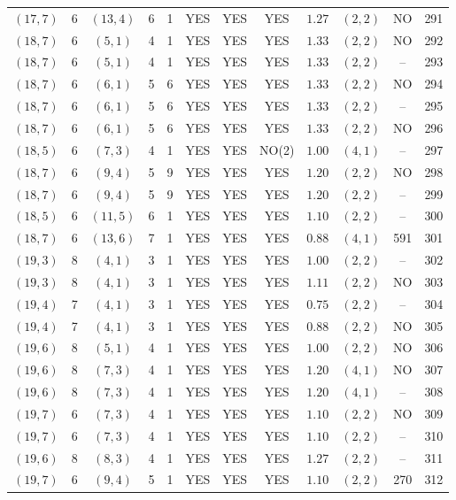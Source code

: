 \begin{longtable}{|c|c|c|c|c|c|c|c|c|c|c|c|}
$(17,7)$ & 6 & $(13,4)$ & 6 & 1 & YES & YES & YES & $1.27$ & $(2,2)$ & NO & 291\\
$(18,7)$ & 6 & $(5,1)$ & 4 & 1 & YES & YES & YES & $1.33$ & $(2,2)$ & NO & 292\\
$(18,7)$ & 6 & $(5,1)$ & 4 & 1 & YES & YES & YES & $1.33$ & $(2,2)$ & -- & 293\\
$(18,7)$ & 6 & $(6,1)$ & 5 & 6 & YES & YES & YES & $1.33$ & $(2,2)$ & NO & 294\\
$(18,7)$ & 6 & $(6,1)$ & 5 & 6 & YES & YES & YES & $1.33$ & $(2,2)$ & -- & 295\\
$(18,7)$ & 6 & $(6,1)$ & 5 & 6 & YES & YES & YES & $1.33$ & $(2,2)$ & NO & 296\\
$(18,5)$ & 6 & $(7,3)$ & 4 & 1 & YES & YES & NO(2) & $1.00$ & $(4,1)$ & -- & 297\\
$(18,7)$ & 6 & $(9,4)$ & 5 & 9 & YES & YES & YES & $1.20$ & $(2,2)$ & NO & 298\\
$(18,7)$ & 6 & $(9,4)$ & 5 & 9 & YES & YES & YES & $1.20$ & $(2,2)$ & -- & 299\\
$(18,5)$ & 6 & $(11,5)$ & 6 & 1 & YES & YES & YES & $1.10$ & $(2,2)$ & -- & 300\\
$(18,7)$ & 6 & $(13,6)$ & 7 & 1 & YES & YES & YES & $0.88$ & $(4,1)$ & 591 & 301\\
$(19,3)$ & 8 & $(4,1)$ & 3 & 1 & YES & YES & YES & $1.00$ & $(2,2)$ & -- & 302\\
$(19,3)$ & 8 & $(4,1)$ & 3 & 1 & YES & YES & YES & $1.11$ & $(2,2)$ & NO & 303\\
$(19,4)$ & 7 & $(4,1)$ & 3 & 1 & YES & YES & YES & $0.75$ & $(2,2)$ & -- & 304\\
$(19,4)$ & 7 & $(4,1)$ & 3 & 1 & YES & YES & YES & $0.88$ & $(2,2)$ & NO & 305\\
$(19,6)$ & 8 & $(5,1)$ & 4 & 1 & YES & YES & YES & $1.00$ & $(2,2)$ & NO & 306\\
$(19,6)$ & 8 & $(7,3)$ & 4 & 1 & YES & YES & YES & $1.20$ & $(4,1)$ & NO & 307\\
$(19,6)$ & 8 & $(7,3)$ & 4 & 1 & YES & YES & YES & $1.20$ & $(4,1)$ & -- & 308\\
$(19,7)$ & 6 & $(7,3)$ & 4 & 1 & YES & YES & YES & $1.10$ & $(2,2)$ & NO & 309\\
$(19,7)$ & 6 & $(7,3)$ & 4 & 1 & YES & YES & YES & $1.10$ & $(2,2)$ & -- & 310\\
$(19,6)$ & 8 & $(8,3)$ & 4 & 1 & YES & YES & YES & $1.27$ & $(2,2)$ & -- & 311\\
$(19,7)$ & 6 & $(9,4)$ & 5 & 1 & YES & YES & YES & $1.10$ & $(2,2)$ & 270 & 312\\

\end{longtable}
